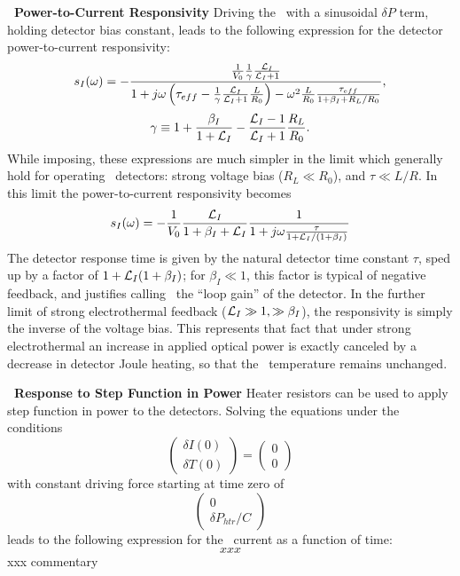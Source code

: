 \textbf{\TES\ Power-to-Current Responsivity}
Driving the \TES\ with a sinusoidal $\delta P$ term, holding detector bias constant, leads to the following expression for the detector power-to-current responsivity:
\begin{equation}\label{eqn:si-full}
s_I(\omega) = 
- \frac{ \frac{1}{V_0} \frac{1}{\gamma} \frac{\mathcal{L}_I}{\mathcal{L}_I + 1} }
       { 1 + j \omega \left( \tau_{eff} - \frac{1}{\gamma}\frac{\mathcal{L}_I}{\mathcal{L}_I + 1} \frac{L}{R_0}\right) - \omega^2 \frac{L}{R_0}\frac{\tau_{eff}}{1 + \beta_I + R_L / R_0}},
\end{equation}
\begin{equation}
\gamma \equiv 1 + \frac{\beta_I}{1+\mathcal{L}_I} - \frac{\mathcal{L}_I - 1}{\mathcal{L}_I + 1}\frac{R_L}{R_0}.
\end{equation}
While imposing, these expressions are much simpler in the limit which generally hold for operating \TES\ detectors: strong voltage bias ($R_L \ll R_0$), and $\tau \ll L/R$. 
In this limit the power-to-current responsivity becomes
\begin{equation}
s_I(\omega) = -\frac{1}{V_0} \frac{\mathcal{L}_I}{1+\beta_I + \mathcal{L}_I} \frac{1}{1 + j \omega \frac{\tau}{1 +\mathcal{L}_I/(1+\beta_I)}}
\end{equation}
The detector response time is given by the natural detector time constant $\tau$, sped up by a factor of $1 + \mathcal{L}_I(1+\beta_I)$; for $\beta_I \ll 1$, this factor is typical of negative feedback, and justifies calling \Loop\ the ``loop gain'' of the detector.
In the further limit of strong electrothermal feedback ($\mathcal{L}_I \gg 1, \gg \beta_I$), the \DC responsivity is simply the inverse of the voltage bias.
This represents that fact that under strong electrothermal an increase in applied optical power is exactly canceled by a decrease in detector Joule heating, so that the \TES\ temperature remains unchanged.

\textbf{\TES\ Response to Step Function in Power}
Heater resistors can be used to apply step function in power to the detectors.
Solving the equations under the conditions
\begin{equation}
\begin{pmatrix} \delta I(0) \\ \delta T(0) \end{pmatrix} = \begin{pmatrix} 0 \\ 0 \end{pmatrix}
\end{equation}
with constant driving force starting at time zero of
\begin{equation}
\begin{pmatrix} 0 \\ \delta P_{htr} / C \end{pmatrix}
\end{equation}
leads to the following expression for the \TES\ current as a function of time:
\begin{equation}
xxx
\end{equation}
xxx commentary

